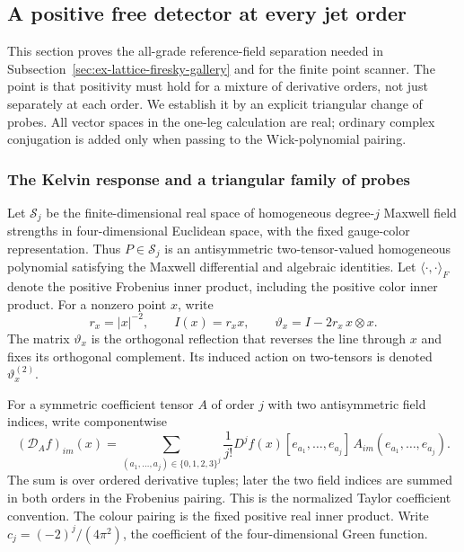 \subsection{A positive free detector at every jet order}
\label{sec:ex-lattice-all-grade-free-detectors}

This section proves the all-grade reference-field separation needed in
Subsection~\ref{sec:ex-lattice-firesky-gallery} and for the finite point
scanner. The point is that positivity must hold for a mixture of derivative
orders, not just separately at each order. We establish it by an explicit
triangular change of probes. All vector spaces in the one-leg calculation
are real; ordinary complex conjugation is added only when passing to the
Wick-polynomial pairing.

\subsubsection{The Kelvin response and a triangular family of probes}

Let $\mathscr S_j$ be the finite-dimensional real space of homogeneous
degree-$j$ Maxwell field strengths in four-dimensional Euclidean space,
with the fixed gauge-color representation. Thus $P\in\mathscr S_j$ is an
antisymmetric two-tensor-valued homogeneous polynomial satisfying the
Maxwell differential and algebraic identities. Let $\langle\cdot,\cdot\rangle_F$
denote the positive Frobenius inner product, including the positive color
inner product. For a nonzero point $x$, write
\[
 r_x=|x|^{-2},\qquad I(x)=r_xx,\qquad
 \vartheta_x=I-2r_x\,x\otimes x.
\]
The matrix $\vartheta_x$ is the orthogonal reflection that reverses the
line through $x$ and fixes its orthogonal complement. Its induced action on
two-tensors is denoted $\vartheta_x^{(2)}$.

For a symmetric coefficient tensor $A$ of order $j$ with two antisymmetric
field indices, write componentwise
\[
 (\mathcal D_A f)_{im}(x)=\sum_{(a_1,\ldots,a_j)\in\{0,1,2,3\}^j}
   \frac{1}{j!}D^jf(x)[e_{a_1},\ldots,e_{a_j}]\,
       A_{im}(e_{a_1},\ldots,e_{a_j}).
\]
The sum is over ordered derivative tuples; later the two field indices are
summed in both orders in the Frobenius pairing. This is the normalized
Taylor coefficient convention. The colour pairing is the fixed positive
real inner product. Write $c_j=(-2)^j/(4\pi^2)$, the coefficient of the
four-dimensional Green function.

